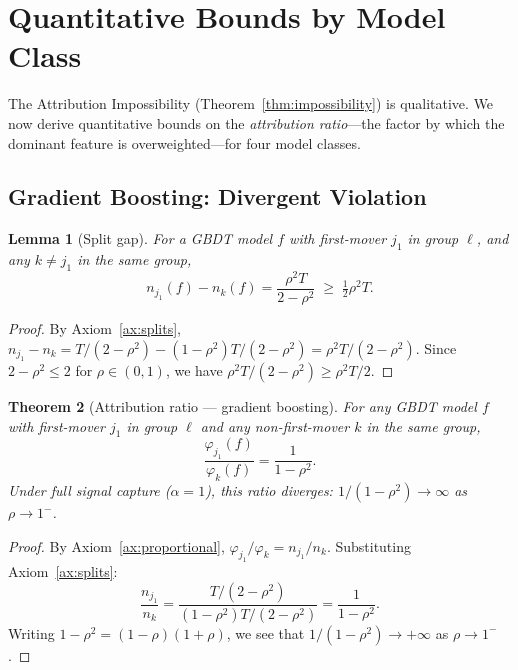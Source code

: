 \documentclass{article}
\newtheorem{theorem}{Theorem}
\newtheorem{lemma}[theorem]{Lemma}
\newcommand{\GBDT}{\textsc{GBDT}}
\begin{document}

\section{Quantitative Bounds by Model Class}
\label{sec:bounds}

The Attribution Impossibility (Theorem~\ref{thm:impossibility}) is qualitative. We now derive quantitative bounds on the \emph{attribution ratio}---the factor by which the dominant feature is overweighted---for four model classes.

\subsection{Gradient Boosting: Divergent Violation}
\label{sec:gbdt-bounds}

\begin{lemma}[Split gap]
\label{lem:split-gap}
For a \GBDT{} model $f$ with first-mover $j_1$ in group $\ell$, and any $k \neq j_1$ in the same group,
\[
    n_{j_1}(f) - n_k(f) = \frac{\rho^2 T}{2 - \rho^2} \;\geq\; \tfrac{1}{2}\rho^2 T.
\]
\end{lemma}

\begin{proof}
By Axiom~\ref{ax:splits}, $n_{j_1} - n_k = T/(2-\rho^2) - (1-\rho^2)T/(2-\rho^2) = \rho^2 T/(2-\rho^2)$.
Since $2 - \rho^2 \leq 2$ for $\rho \in (0,1)$, we have $\rho^2 T/(2-\rho^2) \geq \rho^2 T/2$.
\end{proof}

\begin{theorem}[Attribution ratio --- gradient boosting]
\label{thm:ratio}
For any \GBDT{} model $f$ with first-mover $j_1$ in group $\ell$ and any non-first-mover $k$ in the same group,
\[
    \frac{\varphi_{j_1}(f)}{\varphi_k(f)} = \frac{1}{1 - \rho^2}.
\]
Under full signal capture ($\alpha{=}1$), this ratio diverges: $1/(1-\rho^2) \to \infty$ as $\rho \to 1^-$.
\end{theorem}

\begin{proof}
By Axiom~\ref{ax:proportional}, $\varphi_{j_1}/\varphi_k = n_{j_1}/n_k$.
Substituting Axiom~\ref{ax:splits}:
\[
    \frac{n_{j_1}}{n_k} = \frac{T/(2-\rho^2)}{(1-\rho^2)T/(2-\rho^2)} = \frac{1}{1-\rho^2}.
\]
Writing $1-\rho^2 = (1-\rho)(1+\rho)$, we see that $1/(1-\rho^2) \to +\infty$ as $\rho \to 1^-$.
\end{proof}
\end{document}
